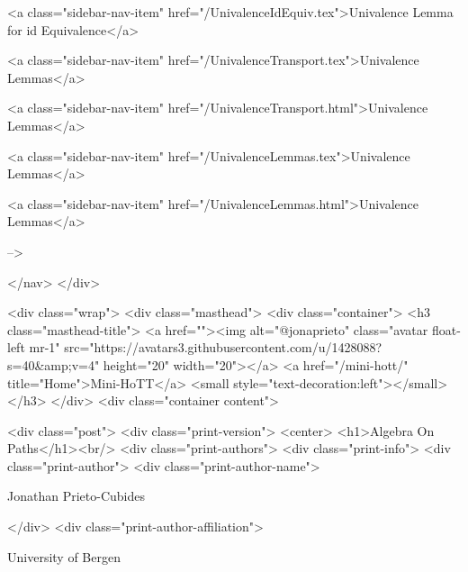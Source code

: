       
        
          <a class="sidebar-nav-item" href="/UnivalenceIdEquiv.tex">Univalence Lemma for id Equivalence</a>
        
      
    
      
        
          <a class="sidebar-nav-item" href="/UnivalenceTransport.tex">Univalence Lemmas</a>
        
      
    
      
        
          <a class="sidebar-nav-item" href="/UnivalenceTransport.html">Univalence Lemmas</a>
        
      
    
      
        
          <a class="sidebar-nav-item" href="/UnivalenceLemmas.tex">Univalence Lemmas</a>
        
      
    
      
        
          <a class="sidebar-nav-item" href="/UnivalenceLemmas.html">Univalence Lemmas</a>
        
      
     -->

  </nav>
</div>

    <div class="wrap">
      <div class="masthead">
        <div class="container">
          <h3 class="masthead-title">
            <a href=""><img alt="@jonaprieto" class="avatar float-left mr-1" src="https://avatars3.githubusercontent.com/u/1428088?s=40&amp;v=4" height="20" width="20"></a>
            <a href="/mini-hott/" title="Home">Mini-HoTT</a>
            <small style="text-decoration:left"></small>
          </h3>
        </div>
      <div class="container content">
        







<div class="post">
  <div class="print-version">
    <center>
      <h1>Algebra On Paths</h1><br/>
        <div class="print-authors">
          <div class="print-info">
            <div class="print-author">
              <div class="print-author-name">
                
                  Jonathan Prieto-Cubides
                
              </div>
              <div class="print-author-affiliation">
                
                  University of Bergen
                
